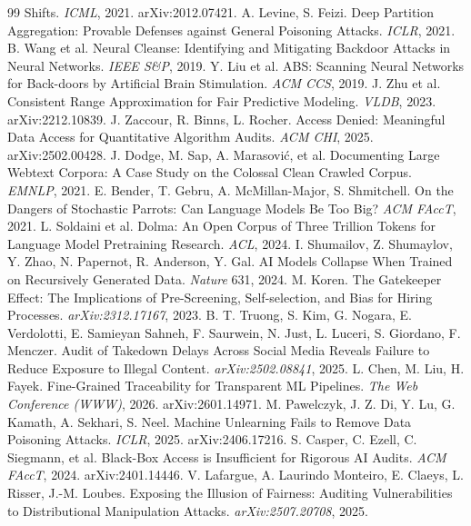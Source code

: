 \documentclass[conference]{IEEEtran}
\begin{document}
\begin{thebibliography}{99}
  Shifts. \emph{ICML}, 2021. arXiv:2012.07421.
 A. Levine, S. Feizi. Deep Partition Aggregation: Provable Defenses against General Poisoning Attacks.
  \emph{ICLR}, 2021.
 B. Wang et al. Neural Cleanse: Identifying and Mitigating Backdoor Attacks in Neural Networks.
  \emph{IEEE S\&P}, 2019.
 Y. Liu et al. ABS: Scanning Neural Networks for Back-doors by Artificial Brain Stimulation.
  \emph{ACM CCS}, 2019.
 J. Zhu et al. Consistent Range Approximation for Fair Predictive Modeling. \emph{VLDB}, 2023.
  arXiv:2212.10839.
 J. Zaccour, R. Binns, L. Rocher. Access Denied: Meaningful Data Access for Quantitative Algorithm
  Audits. \emph{ACM CHI}, 2025. arXiv:2502.00428.
 J. Dodge, M. Sap, A. Marasovi\'c, et al. Documenting Large Webtext Corpora: A Case Study on the Colossal
  Clean Crawled Corpus. \emph{EMNLP}, 2021.
 E. Bender, T. Gebru, A. McMillan-Major, S. Shmitchell. On the Dangers of Stochastic Parrots: Can Language
  Models Be Too Big? \emph{ACM FAccT}, 2021.
 L. Soldaini et al. Dolma: An Open Corpus of Three Trillion Tokens for Language Model Pretraining Research.
  \emph{ACL}, 2024.
 I. Shumailov, Z. Shumaylov, Y. Zhao, N. Papernot, R. Anderson, Y. Gal. AI Models Collapse When Trained on
  Recursively Generated Data. \emph{Nature} 631, 2024.
 M. Koren. The Gatekeeper Effect: The Implications of Pre-Screening, Self-selection, and Bias for Hiring
  Processes. \emph{arXiv:2312.17167}, 2023.
 B. T. Truong, S. Kim, G. Nogara, E. Verdolotti, E. Samieyan Sahneh, F. Saurwein, N. Just, L. Luceri,
  S. Giordano, F. Menczer. Audit of Takedown Delays Across Social Media Reveals Failure to Reduce Exposure to
  Illegal Content. \emph{arXiv:2502.08841}, 2025.
 L. Chen, M. Liu, H. Fayek. Fine-Grained Traceability for Transparent ML Pipelines. \emph{The Web
  Conference (WWW)}, 2026. arXiv:2601.14971.
 M. Pawelczyk, J. Z. Di, Y. Lu, G. Kamath, A. Sekhari, S. Neel. Machine Unlearning Fails to Remove Data
  Poisoning Attacks. \emph{ICLR}, 2025. arXiv:2406.17216.
 S. Casper, C. Ezell, C. Siegmann, et al. Black-Box Access is Insufficient for Rigorous AI Audits.
  \emph{ACM FAccT}, 2024. arXiv:2401.14446.
 V. Lafargue, A. Laurindo Monteiro, E. Claeys, L. Risser, J.-M. Loubes. Exposing the Illusion of Fairness:
  Auditing Vulnerabilities to Distributional Manipulation Attacks. \emph{arXiv:2507.20708}, 2025.

\end{thebibliography}
\end{document}
